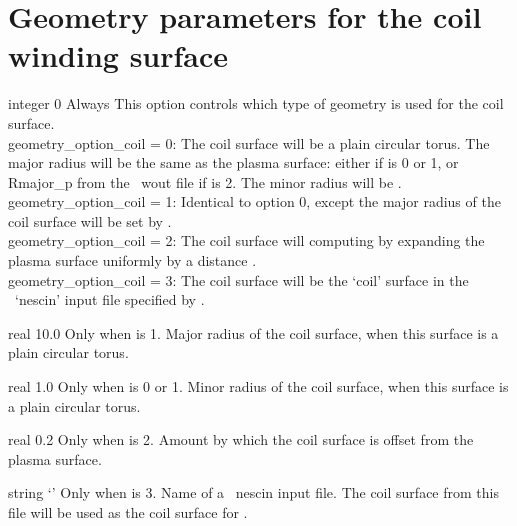 \section{Geometry parameters for the coil winding surface}

{integer}
{0}
{Always}
{This option controls which type of geometry is used for the coil surface.\\

{\ttfamily geometry\_option\_coil} = 0: The coil surface will be a plain circular torus. The major radius will be the 
same as the plasma surface: either  if  is 0 or 1, or {\ttfamily Rmajor\_p} from the \vmec~{\ttfamily wout} file
if   is 2.
     The minor radius will be .\\

{\ttfamily geometry\_option\_coil} = 1: Identical to option 0, except the major radius of the coil surface will be set by .\\

{\ttfamily geometry\_option\_coil} = 2: The coil surface will computing by expanding the plasma surface uniformly by a distance .\\

{\ttfamily geometry\_option\_coil} = 3: The coil surface will be the `coil' surface in the \nescoil~`nescin' input file specified by .
}

\myhrule

{real}
{10.0}
{Only when  is 1.}
{Major radius of the coil surface, when this surface is a plain circular torus.}

\myhrule

{real}
{1.0}
{Only when  is 0 or 1.}
{Minor radius of the coil surface, when this surface is a plain circular torus.}


\myhrule

{real}
{0.2}
{Only when  is 2.}
{Amount by which the coil surface is offset from the plasma surface.}

\myhrule

{string}
{`'}
{Only when  is 3.}
{Name of a \nescoil~{\ttfamily nescin} input file. The coil surface from
this file will be used as the coil surface for \regcoil.}

